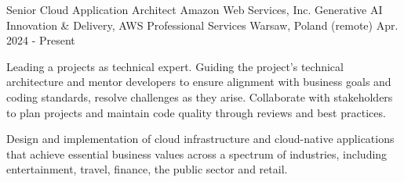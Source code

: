 
\begin{cventries}
  \cventry
    {Senior Cloud Application Architect} %
    {Amazon Web Services, Inc. \break Generative AI Innovation \& Delivery, AWS Professional Services} %
    {Warsaw, Poland (remote)} %
    {Apr. 2024 - Present} %
    {
      \begin{cvitems} %
       \item {Leading a projects as technical expert. Guiding the project’s technical architecture and mentor developers to ensure alignment with business goals and coding standards, resolve challenges as they arise. Collaborate with stakeholders to plan projects and maintain code quality through reviews and best practices.}
       \item {Design and implementation of cloud infrastructure and cloud-native applications that achieve essential business values across a spectrum of industries, including entertainment, travel, finance, the public sector and retail.}
      \end{cvitems}
    }



\end{cventries}
